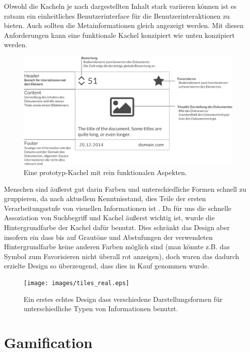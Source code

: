 \documentclass[12pt,twoside]{book}
\begin{document}
Obwohl die Kacheln je nach dargestellten Inhalt stark variieren können ist es ratsam ein einheitliches Benutzerinterface für die Benutzerinteraktionen zu bieten. Auch sollten die Metainformationen gleich angezeigt werden.
Mit diesen Anforderungen kann eine funktionale Kachel konzipiert wie unten konzipiert werden.

\begin{figure}[H]
    \centering
    \includegraphics[width=1.0\textwidth]{images/tiles.eps}
    \caption{Eine prototyp-Kachel mit rein funktionalen Aspekten.}
    \label{fig:awesome_image}
\end{figure}

Menschen sind äußerst gut darin Farben und unterschiedliche Formen schnell zu gruppieren, da nach aktuellem Kenntnisstand, dies Teile der ersten Verarbeitungsstufe von visuellen Informationen ist \citep{treisman1987merkmale}. Da für uns die schnelle Assoziation von Suchbegriff und Kachel äußerst wichtig ist, wurde die Hintergrundfarbe der Kachel dafür benutzt. Dies schränkt das Design aber insofern ein dass bis auf Grautöne und Abstufungen der verwendeten Hintergrundfarbe keine anderen Farben möglich sind (man könnte z.B. das Symbol zum Favorisieren nicht überall rot anzeigen), doch waren das dadurch erzielte Design so überzeugend, dass dies in Kauf genommen wurde.

\begin{figure}[H]
    \centering
    \texttt{[image: images/tiles\_real.eps]}
    \caption{Ein erstes echtes Design dass verschiedene Darstellungsformen für unterschiedliche Typen von Informationen benutzt.}
    \label{fig:awesome_image}
\end{figure}

\section{Gamification}
\end{document}
